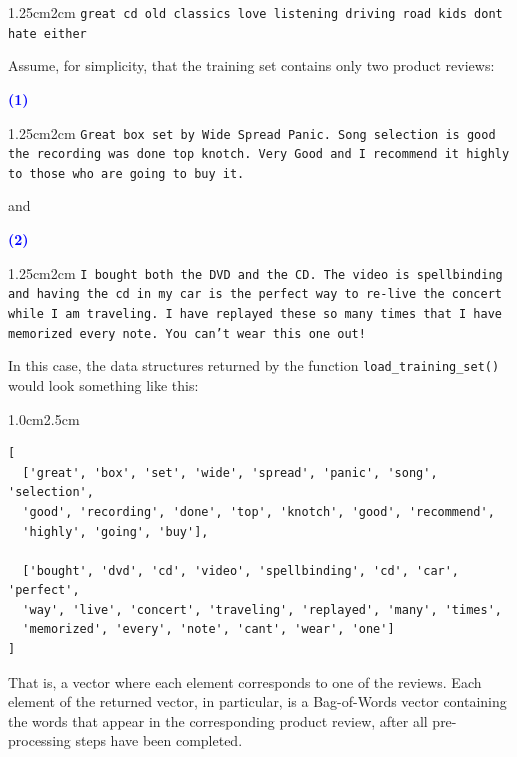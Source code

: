 \documentclass{article}
\begin{document}
\begin{adjustwidth}{1.25cm}{2cm} 
\texttt{great cd old classics love listening driving road kids dont hate either}
\end{adjustwidth}
\vspace{0.5cm}

\noindent Assume, for simplicity, that the training set contains only two product reviews:
\vspace{0.5cm}

\noindent \textbf{\textcolor{blue}{(1)}}
\begin{adjustwidth}{1.25cm}{2cm}
\texttt{Great box set by Wide Spread Panic. Song selection is good the recording was done top knotch. Very Good and I recommend it highly to those who are going to buy it.}
\end{adjustwidth}

\vspace{0.5cm}
\noindent and
\vspace{0.5cm}

\noindent \textbf{\textcolor{blue}{(2)}}
\begin{adjustwidth}{1.25cm}{2cm}
\noindent \texttt{I bought both the DVD and the CD.  The video is spellbinding and having the cd in my car is the perfect way to re-live the concert while I am traveling. I have replayed these so many times that I have memorized every note.  You can't wear this one out!}
\end{adjustwidth}

\vspace{0.75cm}

\noindent In this case, the data structures returned by the function \texttt{load\_training\_set()} would look something like this:

\begin{adjustwidth}{1.0cm}{2.5cm}
\begin{verbatim}
[
  ['great', 'box', 'set', 'wide', 'spread', 'panic', 'song', 'selection', 
  'good', 'recording', 'done', 'top', 'knotch', 'good', 'recommend', 
  'highly', 'going', 'buy'],

  ['bought', 'dvd', 'cd', 'video', 'spellbinding', 'cd', 'car', 'perfect', 
  'way', 'live', 'concert', 'traveling', 'replayed', 'many', 'times', 
  'memorized', 'every', 'note', 'cant', 'wear', 'one']
]
\end{verbatim}
\end{adjustwidth}
\vspace{0.25cm}

\noindent That is, a vector where each element corresponds to one of the reviews. Each element of the returned vector, in particular, is a Bag-of-Words vector containing the words that appear in the corresponding product review, after all pre-processing steps have been completed.
\end{document}
